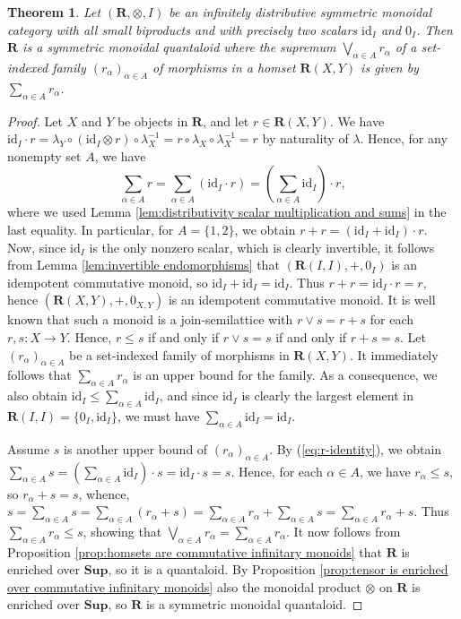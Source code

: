 \documentclass[12pt]{tac}
\newtheorem{theorem}{Theorem}[section]
\theoremstyle{definition}
\theoremstyle{remark}
\newcommand{\<}{\langle}
\renewcommand{\>}{\rangle}
\renewcommand{\:}{\colon}
\newcommand{\id}{\mathrm{id}}
\begin{document}
\begin{theorem}\label{thm:biproducts imply quantaloid}
    Let $(\mathbf R,\otimes, I)$ be an infinitely distributive symmetric monoidal  category  with all small biproducts and with precisely two scalars $\id_I$ and $0_I$. Then $\mathbf R$ is a symmetric monoidal quantaloid where the supremum $\bigvee_{\alpha\in A}r_\alpha$ of a set-indexed family $(r_\alpha)_{\alpha\in A}$ of morphisms in a homset $\mathbf R(X,Y)$ is given by $\sum_{\alpha\in A}r_\alpha$. 
\end{theorem}
\begin{proof}
    Let $X$ and $Y$ be objects in $\mathbf R$, and let $r\in \mathbf R(X,Y)$. We have $\id_I\cdot r=\lambda_Y\circ (\id_I\otimes r)\circ \lambda_X^{-1}=r\circ\lambda_X\circ\lambda_X^{-1}=r$ by naturality of $\lambda$. Hence, for any nonempty set $A$, we have 
    \begin{equation}\label{eq:r-identity}
    \sum_{\alpha\in A}r=\sum_{\alpha\in A}(\id_I\cdot r)=\left(\sum_{\alpha\in A}\id_I\right)\cdot r, 
    \end{equation}
    where we used Lemma \ref{lem:distributivity scalar multiplication and sums} in the last equality.
In particular, for $A=\{1,2\}$, we obtain $r+r=(\id_I+\id_I)\cdot r$. Now, since $\id_I$ is the only nonzero scalar, which is clearly invertible, it follows from Lemma \ref{lem:invertible endomorphisms} that $(\mathbf R(I,I),+,0_I)$ is an idempotent commutative monoid, so $\id_I+\id_I=\id_I$. Thus $r+r=\id_I\cdot r=r$, hence $(\mathbf R(X,Y),+,0_{X,Y})$ is an idempotent commutative monoid. It is well known that such a monoid is a join-semilattice with $r\vee s=r+s$ for each $r,s:X\to Y$. Hence, $r\leq s$ if and only if $r\vee s=s$ if and only if $r+s=s$.
Let $(r_\alpha)_{\alpha\in A}$ be a set-indexed family of morphisms in $\mathbf R(X,Y)$. It immediately follows that $\sum_{\alpha\in A}r_\alpha$ is an upper bound for the family. As a consequence, we also obtain $\id_I\leq\sum_{\alpha\in A}\id_I$, and since $\id_I$ is clearly the largest element in $\mathbf R(I,I)=\{0_I,\id_I\}$, we must have $\sum_{\alpha\in A}\id_I=\id_I$. 

Assume $s$ is another upper bound of $(r_\alpha)_{\alpha\in A}$. By (\ref{eq:r-identity}), we obtain $\sum_{\alpha\in A}s=\left(\sum_{\alpha\in A}\id_I\right)\cdot s=\id_I\cdot s=s$.
Hence, for each $\alpha\in A$, we have $r_\alpha\leq s$, so $r_\alpha+s=s$, whence, $s=\sum_{\alpha\in A}s=\sum_{\alpha\in A}(r_\alpha+s)=\sum_{\alpha\in A}r_\alpha+\sum_{\alpha\in A}s=\sum_{\alpha\in A}r_\alpha+s$. Thus $\sum_{\alpha\in A}r_\alpha\leq s$, showing that $\bigvee_{\alpha\in A}r_\alpha=\sum_{\alpha\in A}r_\alpha$. It now follows from Proposition \ref{prop:homsets are commutative infinitary monoids} that $\mathbf R$ is enriched over $\mathbf{Sup}$, so it is a quantaloid. By Proposition \ref{prop:tensor is enriched over commutative infinitary monoids} also the monoidal product $\otimes$ on $\mathbf R$ is enriched over $\mathbf{Sup}$, so $\mathbf R$ is a symmetric monoidal quantaloid.
\end{proof}
\end{document}
